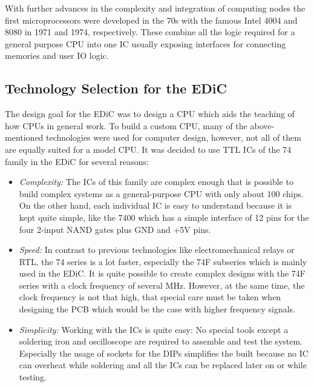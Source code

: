 With further advances in the complexity and integration of computing nodes the first microprocessors were developed in the 70s with the famous Intel 4004 and 8080 in 1971 and 1974, respectively.
These combine all the logic required for a general purpose \gls{CPU} into one \gls{IC} usually exposing interfaces for connecting memories and user \gls{IO} logic.

\subsection{Technology Selection for the \gls{EDiC}}
The design goal for the \gls{EDiC} was to design a \gls{CPU} which aids the teaching of how \glspl{CPU} in general work.
To build a custom \gls{CPU}, many of the above-mentioned technologies were used for computer design, however, not all of them are equally suited for a model \gls{CPU}.
It was decided to use \gls{TTL} \glspl{IC} of the 74 family in the \gls{EDiC} for several reasons:
\begin{itemize}
  \item \emph{Complexity:} The \glspl{IC} of this family are complex enough that is possible to build complex systems as a general-purpose \gls{CPU} with only about 100 chips.
  On the other hand, each individual \gls{IC} is easy to understand because it is kept quite simple, like the 7400 which has a simple interface of 12 pins for the four 2-input NAND gates plus GND and +5V pins.

  \item \emph{Speed:} In contrast to previous technologies like electromechanical relays or \gls{RTL}, the 74 series is a lot faster, especially the 74F subseries which is mainly used in the \gls{EDiC}.
  It is quite possible to create complex designs with the 74F series with a clock frequency of several \unit{\mega\hertz}.
  However, at the same time, the clock frequency is not that high, that special care must be taken when designing the \gls{PCB} which would be the case with higher frequency signals.

  \item \emph{Simplicity:} Working with the \glspl{IC} is quite easy: No special tools except a soldering iron and oscilloscope are required to assemble and test the system.
  Especially the usage of sockets for the \glspl{DIP} simplifies the built because no \gls{IC} can overheat while soldering and all the \glspl{IC} can be replaced later on or while testing.
\end{itemize}

